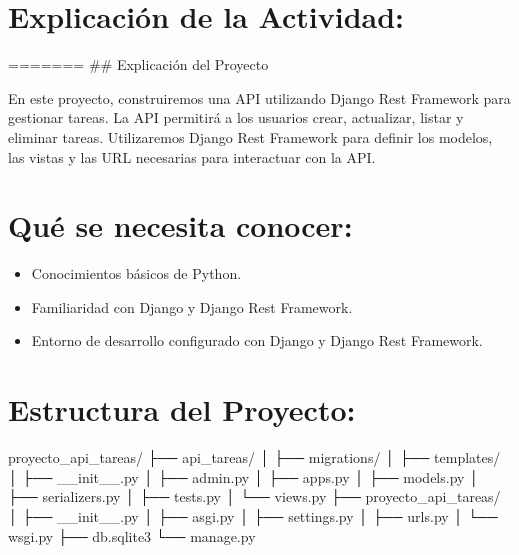 \documentclass[
  a4paper,
  onepage,
  openany]{scrreprt}
\newenvironment{Shaded}{\begin{snugshade}}{\end{snugshade}}
\newcommand{\NormalTok}[1]{\textcolor[rgb]{0.00,0.23,0.31}{#1}}
\providecommand{\tightlist}{%
  \setlength{\itemsep}{0pt}\setlength{\parskip}{0pt}}\usepackage{longtable,booktabs,array}
\begin{document}
\hypertarget{explicaciuxf3n-de-la-actividad-84}{%
\section{Explicación de la
Actividad:}\label{explicaciuxf3n-de-la-actividad-84}}

======= \#\# Explicación del Proyecto

En este proyecto, construiremos una API utilizando Django Rest Framework
para gestionar tareas. La API permitirá a los usuarios crear,
actualizar, listar y eliminar tareas. Utilizaremos Django Rest Framework
para definir los modelos, las vistas y las URL necesarias para
interactuar con la API.

\hypertarget{quuxe9-se-necesita-conocer-1}{%
\section{Qué se necesita conocer:}\label{quuxe9-se-necesita-conocer-1}}

\begin{itemize}
\tightlist
\item
  Conocimientos básicos de Python.
\item
  Familiaridad con Django y Django Rest Framework.
\item
  Entorno de desarrollo configurado con Django y Django Rest Framework.
\end{itemize}

\hypertarget{estructura-del-proyecto-1}{%
\section{Estructura del Proyecto:}\label{estructura-del-proyecto-1}}

\begin{Shaded}
\begin{Highlighting}[]
\NormalTok{proyecto\_api\_tareas/}
\NormalTok{├── api\_tareas/}
\NormalTok{│   ├── migrations/}
\NormalTok{│   ├── templates/}
\NormalTok{│   ├── \_\_init\_\_.py}
\NormalTok{│   ├── admin.py}
\NormalTok{│   ├── apps.py}
\NormalTok{│   ├── models.py}
\NormalTok{│   ├── serializers.py}
\NormalTok{│   ├── tests.py}
\NormalTok{│   └── views.py}
\NormalTok{├── proyecto\_api\_tareas/}
\NormalTok{│   ├── \_\_init\_\_.py}
\NormalTok{│   ├── asgi.py}
\NormalTok{│   ├── settings.py}
\NormalTok{│   ├── urls.py}
\NormalTok{│   └── wsgi.py}
\NormalTok{├── db.sqlite3}
\NormalTok{└── manage.py}
\end{Highlighting}
\end{Shaded}
\end{document}
